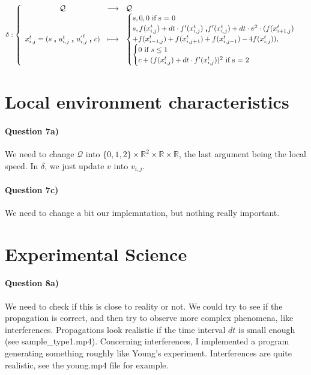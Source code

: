 \documentclass[a4paper,12pt]{article}
\begin{document}
\begin{eqnarray*}
\delta : \left \{ \begin{array}{c c l }
  \mathcal{Q} & \longrightarrow & \mathcal{Q} \\
  x_{i,j}^t = (s \ \pmb{,} \ u^{t}_{i,j}\ \pmb{,} \ u^{_{'} t}_{i,j} \ \pmb{,} \ c) & \longmapsto &
  \begin{cases}s, 0, 0\mbox{ if s = 0}\\
    s, f(x^{t}_{i,j}) + dt \cdot f'(x^t_{i,j})\ \pmb{,} f'(x^t_{i,j}) + dt \cdot v^2 \cdot (f(x^t_{i+1,j}) \\+ f(x^t_{i-1, j}) + f(x^t_{i, j+1}) + f(x^t_{i, j-1}) - 4 f(x^t_{i, j})),\\
    \begin{cases} 0 \mbox{ if }s \leq 1\\
      c + (f(x^{t}_{i,j}) + dt \cdot f'(x^t_{i,j}))^2 \mbox{ if s = 2} \\
    \end{cases}
  \end{cases}
  \end{array} \right .
\end{eqnarray*}


\section{Local environment characteristics}

\paragraph{Question 7a)} We need to change $\mathcal{Q}$ into $\{0,1,2\} \times \mathbb{R}^2 \times \mathbb{R} \times \mathbb{R}$, the last argument being the local speed. In $\delta$, we just update $v$ into $v_{i,j}$.

\paragraph{Question 7c)} We need to change a bit our implemntation, but nothing really important. 

\section{Experimental Science}

\paragraph{Question 8a)} We need to check if this is close to reality or not. We could try to see if the propagation is correct, and then try to observe more complex phenomena, like interferences. Propagations look realistic if the time interval $dt$ is small enough (see sample\_type1.mp4). Concerning interferences, I implemented a program generating something roughly like Young's experiment. Interferences are quite realistic, see the young.mp4 file for example.
\end{document}

